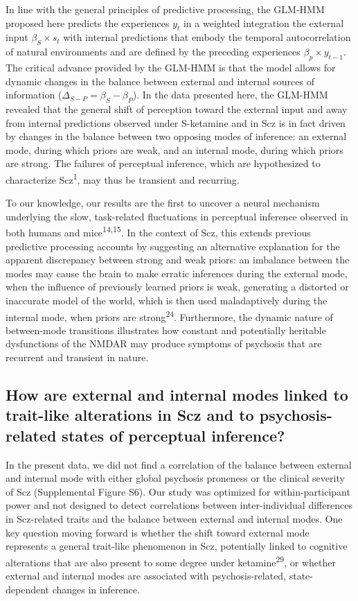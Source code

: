 \documentclass[
]{article}
\begin{document}
In line with the general principles of predictive processing, the
GLM-HMM proposed here predicts the experiences \(y_t\) in a weighted
integration the external input \(\beta_S \times s_t\) with internal
predictions that embody the temporal autocorrelation of natural
environments and are defined by the preceding experiences
\(\beta_p \times y_{t-1}\). The critical advance provided by the GLM-HMM
is that the model allows for dynamic changes in the balance between
external and internal sources of information
(\(\Delta_{S-P} = \beta_S - \beta_P\)). In the data presented here, the
GLM-HMM revealed that the general shift of perception toward the
external input and away from internal predictions observed under
S-ketamine and in Scz is in fact driven by changes in the balance
between two opposing modes of inference: an external mode, during which
priors are weak, and an internal mode, during which priors are strong.
The failures of perceptual inference, which are hypothesized to
characterize Scz\textsuperscript{1}, may thus be transient and
recurring.

To our knowledge, our results are the first to uncover a neural
mechanism underlying the slow, task-related fluctuations in perceptual
inference observed in both humans and mice\textsuperscript{14,15}. In
the context of Scz, this extends previous predictive processing accounts
by suggesting an alternative explanation for the apparent discrepancy
between strong and weak priors: an imbalance between the modes may cause
the brain to make erratic inferences during the external mode, when the
influence of previously learned priors is weak, generating a distorted
or inaccurate model of the world, which is then used maladaptively
during the internal mode, when priors are strong\textsuperscript{24}.
Furthermore, the dynamic nature of between-mode transitions illustrates
how constant and potentially heritable dysfunctions of the NMDAR may
produce symptoms of psychosis that are recurrent and transient in
nature.

\subsection{How are external and internal modes linked to trait-like
alterations in Scz and to psychosis-related states of perceptual
inference?}\label{how-are-external-and-internal-modes-linked-to-trait-like-alterations-in-scz-and-to-psychosis-related-states-of-perceptual-inference}

In the present data, we did not find a correlation of the balance
between external and internal mode with either global psychosis
proneness or the clinical severity of Scz (Supplemental Figure S6). Our
study was optimized for within-participant power and not designed to
detect correlations between inter-individual differences in Scz-related
traits and the balance between external and internal modes. One key
question moving forward is whether the shift toward external mode
represents a general trait-like phenomenon in Scz, potentially linked to
cognitive alterations that are also present to some degree under
ketamine\textsuperscript{29}, or whether external and internal modes are
associated with psychosis-related, state-dependent changes in inference.
\end{document}

